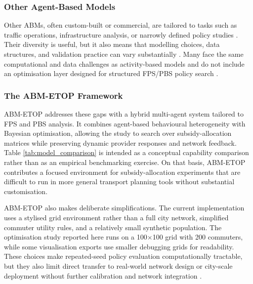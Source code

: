 \documentclass[a4paper,fleqn]{cas-sc}
\begin{document}
\subsubsection{Other Agent-Based Models}
Other ABMs, often custom-built or commercial, are tailored to tasks such as traffic operations, infrastructure analysis, or narrowly defined policy studies \citep{Bazzan2014}. Their diversity is useful, but it also means that modelling choices, data structures, and validation practice can vary substantially \citep{Kagho2020}. Many face the same computational and data challenges as activity-based models and do not include an optimisation layer designed for structured FPS/PBS policy search \citep{Zhao2016}.

\subsubsection{The ABM-ETOP Framework}
ABM-ETOP addresses these gaps with a hybrid multi-agent system tailored to FPS and PBS analysis. It combines agent-based behavioural heterogeneity with Bayesian optimisation, allowing the study to search over subsidy-allocation matrices while preserving dynamic provider responses and network feedback. Table \ref{tab:model_comparison} is intended as a conceptual capability comparison rather than as an empirical benchmarking exercise. On that basis, ABM-ETOP contributes a focused environment for subsidy-allocation experiments that are difficult to run in more general transport planning tools without substantial customisation.

ABM-ETOP also makes deliberate simplifications. The current implementation uses a stylised grid environment rather than a full city network, simplified commuter utility rules, and a relatively small synthetic population. The optimisation study reported here runs on a 100$\times$100 grid with 200 commuters, while some visualisation exports use smaller debugging grids for readability. These choices make repeated-seed policy evaluation computationally tractable, but they also limit direct transfer to real-world network design or city-scale deployment without further calibration and network integration \citep{Horni2016, Auld2016, Axhausen2010}.
\end{document}
